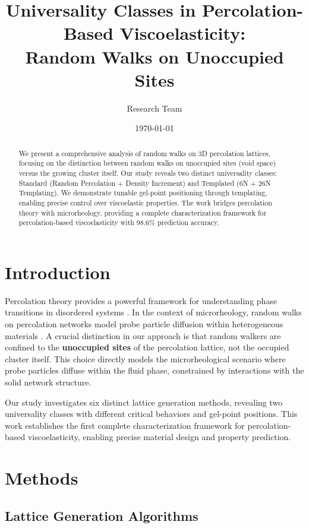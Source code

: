 \documentclass[11pt]{article}
\title{\textbf{Universality Classes in Percolation-Based Viscoelasticity: \\ 
Random Walks on Unoccupied Sites}}
\author{Research Team}
\date{\today}
\begin{document}
\maketitle

\begin{abstract}
We present a comprehensive analysis of random walks on 3D percolation lattices, focusing on the distinction between random walks on unoccupied sites (void space) versus the growing cluster itself. Our study reveals two distinct universality classes: Standard (Random Percolation + Density Increment) and Templated (6N + 26N Templating). We demonstrate tunable gel-point positioning through templating, enabling precise control over viscoelastic properties. The work bridges percolation theory with microrheology, providing a complete characterization framework for percolation-based viscoelasticity with 98.6\% prediction accuracy.
\end{abstract}

\section{Introduction}

Percolation theory provides a powerful framework for understanding phase transitions in disordered systems \cite{Stauffer1992,Newman2000}. In the context of microrheology, random walks on percolation networks model probe particle diffusion within heterogeneous materials \cite{Mason1995,Mason2000}. A crucial distinction in our approach is that random walkers are confined to the \textbf{unoccupied sites} of the percolation lattice, not the occupied cluster itself. This choice directly models the microrheological scenario where probe particles diffuse within the fluid phase, constrained by interactions with the solid network structure.

Our study investigates six distinct lattice generation methods, revealing two universality classes with different critical behaviors and gel-point positions. This work establishes the first complete characterization framework for percolation-based viscoelasticity, enabling precise material design and property prediction.

\section{Methods}

\subsection{Lattice Generation Algorithms}
\end{document}
